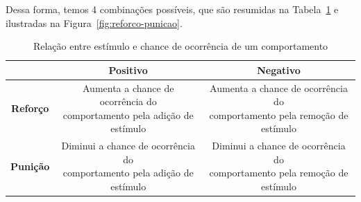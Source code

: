 \documentclass{article}
\begin{document}
                Dessa forma, temos 4 combinações possíveis, que são resumidas na Tabela~\ref{tab:reforco-punicao} e ilustradas na Figura~\ref{fig:reforco-punicao}.
            
                \begin{table}[ht]
                    \centering
                    \begin{tabular}{|c|c|c|}
                        \hline
                         & \textbf{Positivo} & \textbf{Negativo} \\
                        \hline
                        \textbf{Reforço} & \makecell{Aumenta a chance de ocorrência do \\ comportamento pela adição de estímulo} & \makecell{Aumenta a chance de ocorrência do \\ comportamento pela remoção de estímulo} \\
                        \hline
                        \textbf{Punição} & \makecell{Diminui a chance de ocorrência do \\ comportamento pela adição de estímulo} & \makecell{Diminui a chance de ocorrência do \\ comportamento pela remoção de estímulo} \\
                        \hline
                    \end{tabular}
                    \caption{Relação entre estímulo e chance de ocorrência de um comportamento}
                    \label{tab:reforco-punicao}
                \end{table}
            
\end{document}
